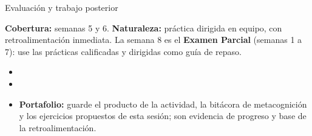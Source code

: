 \documentclass[10pt,aspectratio=169]{beamer}
\begin{document}
\begin{frame}{Evaluación y trabajo posterior}
  \small
  \begin{evalbox}
    \textbf{Cobertura:} semanas 5 y 6. \textbf{Naturaleza:} práctica dirigida en equipo, con retroalimentación inmediata. La semana 8 es el \textbf{Examen Parcial} (semanas 1 a 7): use las prácticas calificadas y dirigidas como guía de repaso.
  \end{evalbox}
  \begin{itemize}
    \item \criterios
    \item \declaracionia
    \item \textbf{Portafolio:} guarde el producto de la actividad, la bitácora de metacognición y los ejercicios propuestos de esta sesión; son evidencia de progreso y base de la retroalimentación.
  \end{itemize}
\end{frame}
\end{document}
